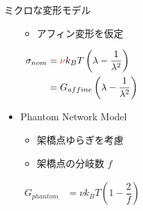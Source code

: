 \documentclass[12pt, dvipdfmx]{beamer}
\begin{document}
\begin{frame}
\begin{columns}[T, onlytextwidth]
\begin{exampleblock}{ミクロな変形モデル}
\begin{itemize}
                            \begin{itemize}
                                \item アフィン変形を仮定
                            \end{itemize}
                            \vspace{-3mm}
                            \scriptsize
                            \begin{align*}
                                \sigma_{nom} &= \textcolor{red}{\nu} k_B T \left(\lambda - \dfrac{1}{\lambda^2}\right) \\
                                &= G_{affine} \left(\lambda - \dfrac{1}{\lambda^2}\right)
                            \end{align*}
                            \normalsize
                        \item Phantom Network Model
                        \vspace{-5mm}
                            \begin{itemize}
                                \item \alert{架橋点ゆらぎ}を考慮
                                \item 架橋点の分岐数 $f$
                            \end{itemize}
                            \vspace{-3mm}
                            \scriptsize
                            \begin{align*}
                                G_{phantom} &= \nu k_B T \left(1 - \dfrac{2}{f}\right) \\
                            \end{align*}
                            \normalsize
                    \end{itemize}
                \end{exampleblock}
        \end{columns}       
\end{frame}
\end{document}
